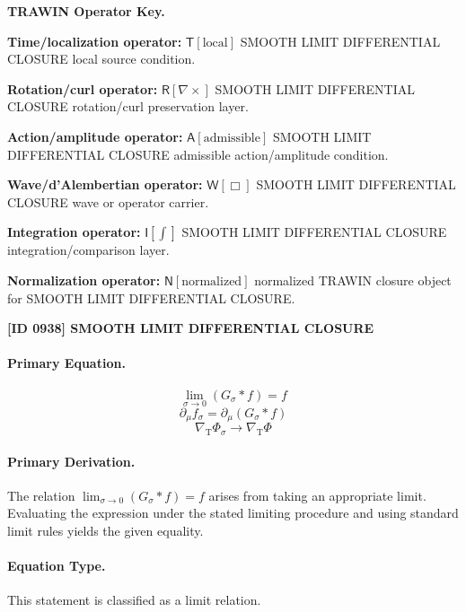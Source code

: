 \par\vspace{0.45\baselineskip}
\noindent\begin{minipage}[t]{\linewidth}
\begingroup
\small
\raggedright
\textbf{TRAWIN Operator Key.}\par
\noindent\textbf{Time/localization operator:} $\mathsf{T}\!\left[\mathrm{local}\right]$ SMOOTH LIMIT DIFFERENTIAL CLOSURE local source condition.\par
\noindent\textbf{Rotation/curl operator:} $\mathsf{R}\!\left[\nabla\times\right]$ SMOOTH LIMIT DIFFERENTIAL CLOSURE rotation/curl preservation layer.\par
\noindent\textbf{Action/amplitude operator:} $\mathsf{A}\!\left[\mathrm{admissible}\right]$ SMOOTH LIMIT DIFFERENTIAL CLOSURE admissible action/amplitude condition.\par
\noindent\textbf{Wave/d'Alembertian operator:} $\mathsf{W}\!\left[\Box\right]$ SMOOTH LIMIT DIFFERENTIAL CLOSURE wave or operator carrier.\par
\noindent\textbf{Integration operator:} $\mathsf{I}\!\left[\int\right]$ SMOOTH LIMIT DIFFERENTIAL CLOSURE integration/comparison layer.\par
\noindent\textbf{Normalization operator:} $\mathsf{N}\!\left[\mathrm{normalized}\right]$ normalized TRAWIN closure object for SMOOTH LIMIT DIFFERENTIAL CLOSURE.\par
\endgroup
\end{minipage}

\clearpage
\noindent\textbf{[ID 0938] SMOOTH LIMIT DIFFERENTIAL CLOSURE}\par
\vspace{0.35em}
\paragraph{Primary Equation.}
\[
\lim_{\sigma\to 0}(G_{\sigma}*f)=f
\]
\[
\partial_{\mu}f_{\sigma}=\partial_{\mu}(G_{\sigma}*f)
\]
\[
\nabla_{\mathrm{T}}\Phi_{\sigma}\to \nabla_{\mathrm{T}}\Phi
\]

\paragraph{Primary Derivation.}
The relation \( \lim_{\sigma\to 0}(G_{\sigma}*f)=f \) arises from taking an appropriate limit. Evaluating the expression under the stated limiting procedure and using standard limit rules yields the given equality.
\paragraph{Equation Type.}
This statement is classified as a limit relation.

